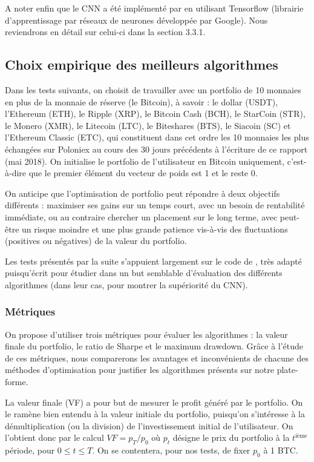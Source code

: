 \documentclass[a4paper, 10pt]{article}
\begin{document}
A noter enfin que le CNN a été implémenté par \citet{Jiang2017} en utilisant Tensorflow (librairie d’apprentissage par réseaux de neurones développée par Google). Nous reviendrons en détail sur celui-ci dans la section 3.3.1.

\subsection{Choix empirique des meilleurs algorithmes}
\label{sec:theorie_empirique}

Dans les tests suivants, on choisit de travailler avec un portfolio de 10 monnaies en plus de la monnaie de réserve (le Bitcoin), à savoir : le dollar (USDT), l'Ethereum (ETH), le Ripple (XRP), le Bitcoin Cash (BCH), le StarCoin (STR), le Monero (XMR), le Litecoin (LTC), le Biteshares (BTS), le Siacoin (SC) et l'Ethereum Classic (ETC), qui constituent dans cet ordre les 10 monnaies les plus échangées sur Poloniex au cours des 30 jours précédents à l'écriture de ce rapport (mai 2018). On initialise le portfolio de l'utilisateur en Bitcoin uniquement, c'est-à-dire que le premier élément du vecteur de poids est 1 et le reste 0.

On anticipe que l'optimisation de portfolio peut répondre à deux objectifs différents : maximiser ses gains sur un temps court, avec un besoin de rentabilité immédiate, ou au contraire chercher un placement sur le long terme, avec peut-être un risque moindre et une plus grande patience vis-à-vis des fluctuations (positives ou négatives) de la valeur du portfolio.

Les tests présentés par la suite s'appuient largement sur le code de \citet{Jiang2017}, très adapté puisqu'écrit pour étudier dans un but semblable d'évaluation des différents algorithmes (dans leur cas, pour montrer la supériorité du CNN).

\subsubsection{Métriques}
\label{sec:theorie_empirique_metriques}

On propose d'utiliser trois métriques pour évaluer les algorithmes : la valeur finale du portfolio, le ratio de Sharpe et le maximum drawdown. Grâce à l'étude de ces métriques, nous comparerons les avantages et inconvénients de chacune des méthodes d'optimisation pour justifier les algorithmes présents sur notre plate-forme.

La valeur finale (VF) a pour but de mesurer le profit généré par le portfolio. On le ramène bien entendu à la valeur initiale du portfolio, puisqu'on s'intéresse à la démultiplication (ou la division) de l'investissement initial de l'utilisateur. On l'obtient donc par le calcul $VF = p_T / p_0$ où $p_t$ désigne le prix du portfolio à la $t^{\text{ième}}$ période, pour $0 \leq t \leq T$. On se contentera, pour nos tests, de fixer $p_0$ à 1 BTC.
\end{document}
